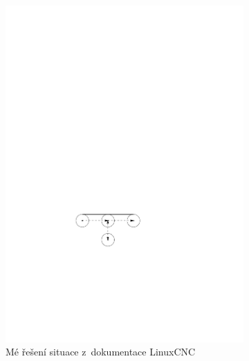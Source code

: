 			\begin{figure}[h]
				\centering
					\begin{subfigure}[b]{0.42\textwidth}
						\centering
						\includegraphics[width=\textwidth]{img/korekce-leadin1.pdf}
						\caption{Mé řešení situace z~dokumentace LinuxCNC}
					\end{subfigure}
					~~~
					\begin{subfigure}[b]{0.3\textwidth}
						\centering

\end{subfigure}
\end{figure}
